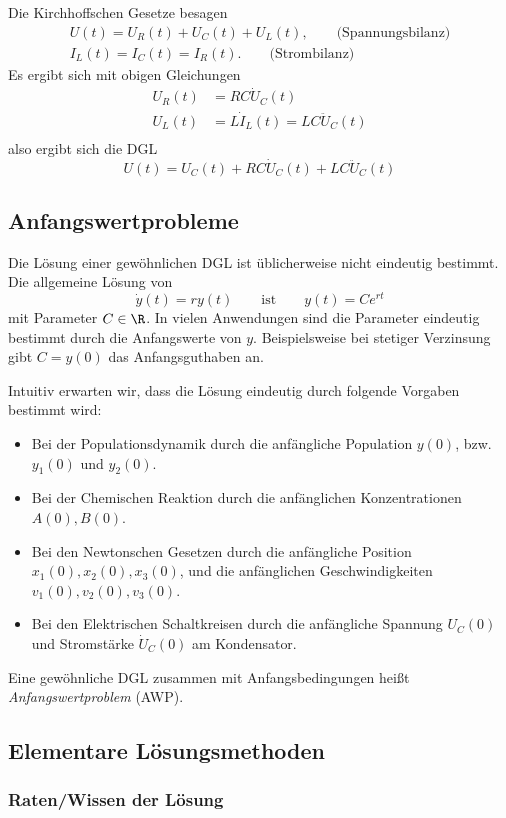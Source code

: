 \documentclass[
]{mycourse}
\begin{document}
Die Kirchhoffschen Gesetze besagen
\begin{gather*}
	U(t) = U_R(t) + U_C(t) + U_L(t), \qquad \text{(Spannungsbilanz)} \\
	I_L(t) =  I_C(t) = I_R(t). \qquad \text{(Strombilanz)}
\end{gather*}
Es ergibt sich mit obigen Gleichungen
\begin{align*}
	U_R(t) &= RC \dot U_C(t) \\
	U_L(t) &= L \dot I_L(t) = LC \ddot U_C(t) \\
\end{align*}
also ergibt sich die DGL
\[
	U(t) = U_C(t) + RC \dot U_C(t) + LC \ddot U_C(t)
\]


\subsection{Anfangswertprobleme}


Die Lösung einer gewöhnlichen DGL ist üblicherweise nicht eindeutig bestimmt.
Die allgemeine Lösung von
\[
	\dot y(t) = ry(t)
	\qquad \text{ist} \qquad
	y(t) = Ce^{rt}
\]
mit Parameter $C \in \R$.
In vielen Anwendungen sind die Parameter eindeutig bestimmt durch die Anfangswerte von $y$.
Beispielsweise bei stetiger Verzinsung gibt $C=y(0)$ das Anfangsguthaben an.

Intuitiv erwarten wir, dass die Lösung eindeutig durch folgende Vorgaben bestimmt wird:
\begin{itemize}
	\item
		Bei der Populationsdynamik durch die anfängliche Population $y(0)$, bzw. $y_1(0)$ und $y_2(0)$.
	\item
		Bei der Chemischen Reaktion durch die anfänglichen Konzentrationen $A(0), B(0)$.
	\item
		Bei den Newtonschen Gesetzen durch die anfängliche Position $x_1(0),x_2(0),x_3(0)$, und die anfänglichen Geschwindigkeiten $v_1(0), v_2(0), v_3(0)$.
	\item
		Bei den Elektrischen Schaltkreisen durch die anfängliche Spannung $U_C(0)$ und Stromstärke $\dot U_C(0)$ am Kondensator.
\end{itemize}
Eine gewöhnliche DGL zusammen mit Anfangsbedingungen heißt \emph{Anfangswertproblem} (AWP).


\subsection{Elementare Lösungsmethoden}


\subsubsection{Raten/Wissen der Lösung}
\end{document}
